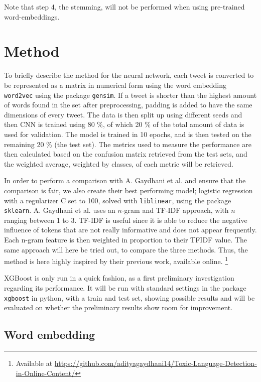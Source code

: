 \documentclass[twocolumn]{article}
\begin{document}
Note that step 4, the stemming, will not be performed when using pre-trained word-embeddings. 

\section{Method}

To briefly describe the method for the neural network, each tweet is converted to be represented as a matrix in numerical form using the word embedding \verb|word2vec| using the package \verb|gensim|. If a tweet is shorter than the highest amount of words found in the set after preprocessing, padding is added to have the same dimensions of every tweet. The data is then split up using different seeds and then CNN is trained using 80 \%, of which 20 \% of the total amount of data is used for validation. The model is trained in 10 epochs, and is then tested on the remaining 20 \% (the test set). The metrics used to measure the performance are then calculated based on the confusion matrix retrieved from the test sets, and the weighted average, weighted by classes, of each metric will be retrieved. 

In order to perform a comparison with A. Gaydhani et al. \cite{gaydhani} and ensure that the comparison is fair, we also create their best performing model; logistic regression with a regularizer C set to 100, solved with \verb|liblinear|, using the package \verb|sklearn|. A. Gaydhani et al. uses an $n$-gram and TF-IDF approach, with $n$ ranging between 1 to 3. TF-IDF is useful since it is able to reduce the negative influence of tokens that are not really informative and does not appear frequently. Each n-gram feature is then weighted in proportion to their TFIDF value. The same approach will here be tried out, to compare the three methods. Thus, the method is here highly inspired by their previous work, available online. \footnote{Available at \url{https://github.com/adityagaydhani14/Toxic-Language-Detection-in-Online-Content/}}

XGBoost is only run in a quick fashion, as a first preliminary investigation regarding its performance. It will be run with standard settings in the package \verb|xgboost| in python, with a train and test set, showing possible results and will be evaluated on whether the preliminary results show room for improvement.

\subsection{Word embedding}
\end{document}
